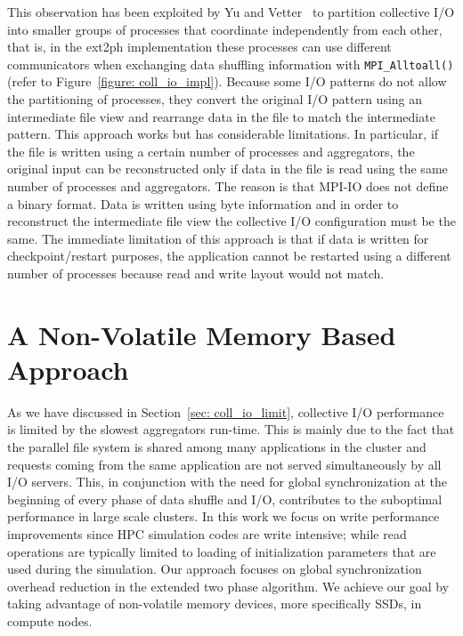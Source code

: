 This observation has been exploited by Yu and Vetter~\cite{Yu08} to partition collective I/O into smaller groups of processes that coordinate independently from each other, that is, in the ext2ph
implementation these processes can use different communicators when exchanging data shuffling information with \texttt{MPI\_Alltoall()} (refer to Figure~\ref{figure: coll_io_impl}). Because 
some I/O patterns do not allow the partitioning of processes, they convert the original I/O pattern using an intermediate file view and rearrange data in the file to match the intermediate pattern. This 
approach works but has considerable limitations. In particular, if the file is written using a certain number of processes and aggregators, the original input can be reconstructed only if data in the file 
is read using the same number of processes and aggregators. The reason is that MPI-IO does not define a binary format. Data is written using byte information and in order to reconstruct the intermediate
file view the collective I/O configuration must be the same. The immediate limitation of this approach is that if data is written for checkpoint/restart purposes, the application cannot be restarted using a 
different number of processes because read and write layout would not match.

\section{A Non-Volatile Memory Based Approach} \label{sec: nvm-approach}
As we have discussed in Section~\ref{sec: coll_io_limit}, collective I/O performance is limited by the slowest aggregators run-time. This is mainly due to the fact that the parallel 
file system is shared among many applications in the cluster and requests coming from the same application are not served simultaneously by all I/O servers. This, in conjunction with 
the need for global synchronization at the beginning of every phase of data shuffle and I/O, contributes to the suboptimal performance in large scale clusters. In this work we focus 
on write performance improvements since HPC simulation codes are write intensive; while read operations are typically limited to loading of initialization parameters that are used 
during the simulation. Our approach focuses on global synchronization overhead reduction in the extended two phase algorithm. We achieve our goal by taking advantage of non-volatile 
memory devices, more specifically SSDs, in compute nodes. 

